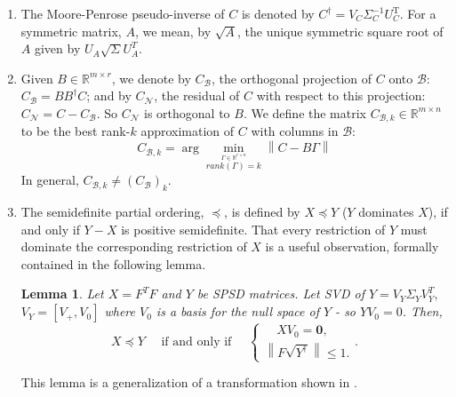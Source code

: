 \documentclass[11pt]{article}
\newtheorem{lemma}[theorem]{Lemma}
\renewcommand{\math}[1]{$#1$}
\def\reals{\mathbb{R}}
\newcommand{\norm}[1]{\left\|#1\right\|}
\newcommand{\Leq}{\preceq}
\newcommand{\B}{\mathcal{B}}
\newcommand{\N}{\mathcal{N}}
\newcommand{\G}{\Gamma}
\newcommand{\0}{\ensuremath{\mathbf{0}}}
\renewcommand{\>}{\succ}
\newcommand{\<}{\prec}
\begin{document}
\begin{enumerate}
\item The Moore-Penrose pseudo-inverse of $C$ is denoted by $C^{\dagger} = V_C\Sigma_C^{-1}U_C^{\text{T}}$. For a symmetric matrix, $A$, we mean, by $\sqrt{A}$, the unique symmetric square root of $A$ given by $U_A \sqrt{\Sigma} U_A ^T$. 

\item Given $B \in \reals^{m \times r}$, we denote by $C_{\B}$, the orthogonal projection of $C$ onto $\B$: $C_{\B} = BB^{\dagger}C$; and by $C_{\N}$, the residual of $C$ with respect to this projection: $C_{\N} = C - C_{\B}$. So $C_{\N}$ is orthogonal to $B$. 
We define the matrix $C_{\B,k} \in \reals^{m \times n}$ to be the best rank-$k$ approximation of ${C}$ with columns in $\B$:
\[ C_{\B, k} = \arg \min_{\stackrel{\G \in \reals^{r \times n}}{rank(\G) = k}} \norm{C - B\G}\]
In general, $C_{\B,k} \neq (C_{\B})_k$. 

\item The semidefinite partial ordering, $\Leq$, is defined by $X \Leq Y$ ($Y$ dominates $X$), if and only if $Y - X$ is positive semidefinite. That every restriction of $Y$ must dominate the corresponding restriction of $X$ is a useful observation, formally contained in the following lemma.
\begin{lemma}\label{basic lemma}
Let $X = F^TF$ and  $Y$ be SPSD matrices. Let SVD of $Y = V_Y\Sigma_Y V_Y^T,$ $V_Y = [V_+, V_0]$ where $V_0$ is a basis for the null space of 
$Y$ - so \math{YV_0=0}. Then, 
\[X \Leq Y \quad \text{  if and only if } \quad
\begin{cases}
\quad XV_0 = \0, \\[3pt]
\norm{F \sqrt{Y^{\dagger}} } \leq 1.
\end{cases}.
\]
\end{lemma}
\noindent This lemma is a generalization of a transformation shown in \cite{SR}.
\end{enumerate}
\end{document}
